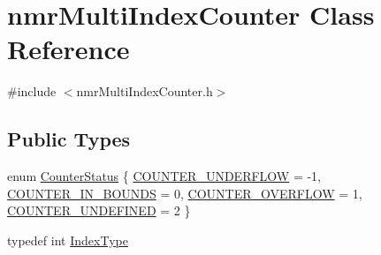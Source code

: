 \hypertarget{classnmr_multi_index_counter}{}\section{nmr\+Multi\+Index\+Counter Class Reference}
\label{classnmr_multi_index_counter}


{\ttfamily \#include $<$nmr\+Multi\+Index\+Counter.\+h$>$}

\subsection*{Public Types}
\begin{DoxyCompactItemize}
\item 
enum \hyperlink{classnmr_multi_index_counter_ad7beda3a3ee347140b4b5540770aeba5}{Counter\+Status} \{ \hyperlink{classnmr_multi_index_counter_ad7beda3a3ee347140b4b5540770aeba5a7ef7728fe4f2d2360228d3f73d17aa34}{C\+O\+U\+N\+T\+E\+R\+\_\+\+U\+N\+D\+E\+R\+F\+L\+O\+W} = -\/1, 
\hyperlink{classnmr_multi_index_counter_ad7beda3a3ee347140b4b5540770aeba5a606ccb8b13969ab6d6867038d58b5974}{C\+O\+U\+N\+T\+E\+R\+\_\+\+I\+N\+\_\+\+B\+O\+U\+N\+D\+S} = 0, 
\hyperlink{classnmr_multi_index_counter_ad7beda3a3ee347140b4b5540770aeba5a8c8a5600eadc951f5289ee1220138047}{C\+O\+U\+N\+T\+E\+R\+\_\+\+O\+V\+E\+R\+F\+L\+O\+W} = 1, 
\hyperlink{classnmr_multi_index_counter_ad7beda3a3ee347140b4b5540770aeba5a2bf5f16725f84bef901340f84c7b5262}{C\+O\+U\+N\+T\+E\+R\+\_\+\+U\+N\+D\+E\+F\+I\+N\+E\+D} = 2
 \}
\item 
typedef int \hyperlink{classnmr_multi_index_counter_a0632b941a7d18df347174b4345d73d01}{Index\+Type}
\end{DoxyCompactItemize}
